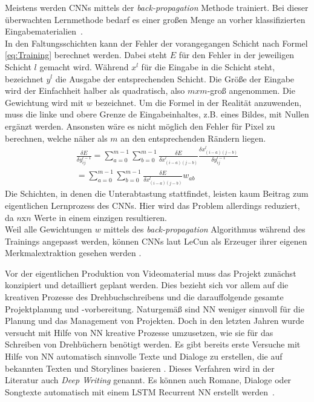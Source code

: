 \documentclass[times, 11pt,twocolumn]{article}
\begin{document}
 \label{sec:Training}
Meistens werden CNNs mittels der \textit{back-propagation} Methode trainiert. Bei dieser überwachten Lernmethode bedarf es einer großen Menge an vorher klassifizierten Eingabematerialien~\cite{5537907}. \\
In den Faltungsschichten kann der Fehler der vorangegangen Schicht nach Formel \ref{eq:Training} berechnet werden. Dabei steht $E$ für den Fehler in der jeweiligen Schicht $l$ gemacht wird. Während $x^l$ für die Eingabe in die Schicht steht, bezeichnet $y^l$ die Ausgabe der entsprechenden Schicht. Die Größe der Eingabe wird der Einfachheit halber als quadratisch, also $mxm$-groß angenommen. Die Gewichtung wird mit $w$ bezeichnet. Um die Formel in der Realität anzuwenden, muss die linke und obere Grenze de Eingabeinhaltes, z.B. eines Bildes, mit Nullen ergänzt werden. Ansonsten wäre es nicht möglich den Fehler für Pixel zu berechnen, welche näher als $m$ an den entsprechenden Rändern liegen. \\
\footnotesize
\begin{equation}
\begin{aligned}
\frac{\delta E}{\delta y_{ij}^{l-1}} = \sum_{a=0}^{m-1} \sum_{b=0}^{m-1} \frac{\delta E}{\delta x_{(i-a)(j-b)}^{l}} \frac{\delta x_{(i-a)(j-b)}^{l}}{\delta y_{ij}^{l-1}}  \\
= \sum \limits_{a=0}^{m-1} \sum \limits_{b=0}^{m-1} \frac{\delta E}{\delta x_{(i-a)(j-b)}^{l}} w_{ab}
\end{aligned}
	\label{eq:Training}
\end{equation}
\small
Die Schichten, in denen die Unterabtastung stattfindet, leisten kaum Beitrag zum eigentlichen Lernprozess des CNNs. Hier wird das Problem allerdings reduziert, da $n$x$n$ Werte in einem einzigen resultieren. \\
Weil alle Gewichtungen $w$ mittels des \textit{back-propagation} Algorithmus während des Trainings angepasst werden, können CNNs laut LeCun als Erzeuger ihrer eigenen Merkmalextraktion gesehen werden \cite{LeCun:1998:CNI:303568.303704}.


 \label{sec:Konzeption}
Vor der eigentlichen Produktion von Videomaterial muss das Projekt zunächst konzipiert und detailliert geplant werden. Dies bezieht sich vor allem auf die kreativen Prozesse des Drehbuchschreibens und die darauffolgende gesamte Projektplanung und -vorbereitung. Naturgemäß sind NN weniger sinnvoll für die Planung und das Management von Projekten. Doch in den letzten Jahren wurde versucht mit Hilfe von NN kreative Prozesse umzusetzen, wie sie für das Schreiben von Drehbüchern benötigt werden. Es gibt bereits erste Versuche mit Hilfe von NN automatisch sinnvolle Texte und Dialoge zu erstellen, die auf bekannten Texten und Storylines basieren \cite{Thoma16}. Dieses Verfahren wird in der Literatur auch \textit{Deep Writing} genannt. Es können auch Romane, Dialoge oder Songtexte automatisch mit einem LSTM Recurrent NN erstellt werden~\cite{DrehbuchWrite}.
\end{document}
